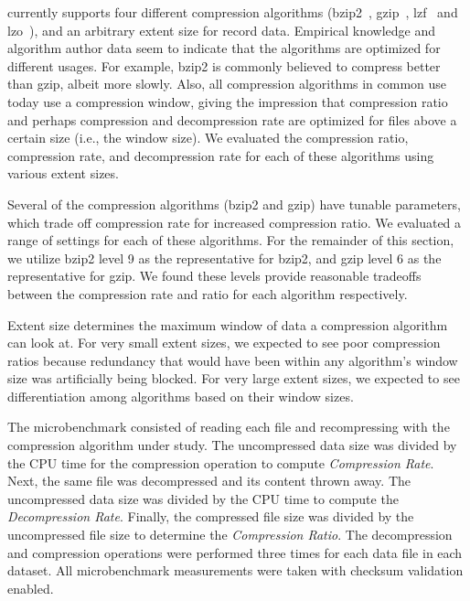 \DataSeries{} currently supports four different compression algorithms
(bzip2~\cite{BZIP}, gzip~\cite{GZIP}, lzf~\cite{LZF} and lzo~\cite{LZO}),
and an arbitrary extent size for record data.  Empirical knowledge and
algorithm author data seem to indicate that the algorithms are
optimized for different usages.  For example, bzip2 is commonly
believed to compress better than gzip, albeit more slowly.  Also,
all compression algorithms in common use today use a compression
window, giving the impression that compression ratio and perhaps
compression and decompression rate are optimized for files above a
certain size (i.e., the window size).  
We evaluated the compression ratio, compression rate, 
and decompression rate for each of these algorithms
using various extent sizes.

Several of the compression algorithms (bzip2 and gzip)
have tunable parameters, which trade 
off compression rate for increased compression ratio.
We evaluated a range of settings for each of these algorithms.  
For the remainder of this section, we utilize bzip2 level 9 as
the representative for bzip2, and gzip level 6 as the representative
for gzip.  We found these levels provide reasonable tradeoffs
between the compression rate and ratio for each algorithm respectively.

Extent size determines the maximum window of data a compression
algorithm can look at.  For very small extent sizes, we expected to
see poor compression ratios because redundancy that would have been
within any algorithm's window size was artificially being blocked.
For very large extent sizes, we expected to see differentiation among
algorithms based on their window sizes.

The microbenchmark consisted of reading each \DataSeries{} file
and recompressing with the compression
algorithm under study.  The uncompressed data size was divided by the CPU time for the compression
operation  to compute {\em
Compression Rate}.  Next, the same file was decompressed and its
content thrown away.  The uncompressed data size was divided by the CPU time 
to compute the {\em Decompression Rate}.  
Finally, the compressed \DataSeries{} file size was
divided by the uncompressed \DataSeries{} file size to determine the {\em
Compression Ratio}.  The decompression and compression operations were
performed three times for each data file in each dataset.  All microbenchmark 
measurements were taken with checksum validation enabled.

